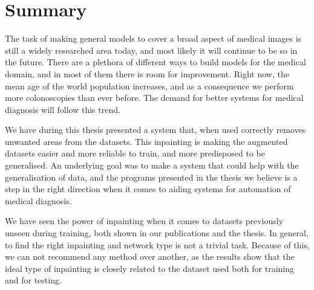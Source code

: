 \section{Summary}
The task of making general models to cover a broad aspect of medical images is still a widely researched area today, and most likely it will continue to be so in the future. There are a plethora of different ways to build models for the medical domain, and in most of them there is room for improvement. Right now, the mean age of the world population increases, and as a consequence we perform more colonoscopies than ever before. The demand for better systems for medical diagnosis will follow this trend.

We have during this thesis presented a system that, when used correctly removes unwanted areas from the datasets. This inpainting is making the augmented datasets easier and more reliable to train, and more predisposed to be generalised.
An underlying goal was to make a system that could help with the generalisation of data, and the programs presented in the thesis we believe is a step in the right direction when it comes to aiding systems for automation of medical diagnosis.

We have seen the power of inpainting when it comes to datasets previously unseen during training, both shown in our publications and the thesis.
In general, to find the right inpainting and network type is not a trivial task. Because of this, we can not recommend any method over another, as the results show that the ideal type of inpainting is closely related to the dataset used both for training and for testing.
 


